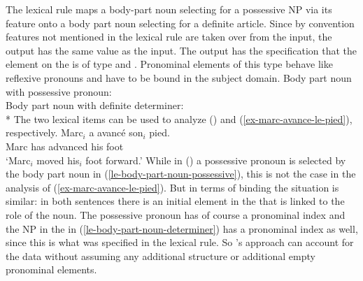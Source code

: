 \documentclass[output=paper,biblatex,babelshorthands,newtxmath,draftmode,colorlinks,citecolor=brown]{langscibook}
\begin{document}
\noindent
The lexical rule maps a body-part noun selecting for a possessive NP  via its \spr feature onto a
body part noun selecting for a definite article. Since by convention features not mentioned in the
lexical rule are taken over from the input, the output has the same \cont value as the input. The
output has the specification that the element on the \argst is of type  and
. Pronominal elements of this type behave like reflexive pronouns and have to be bound
in the subject domain.
\eal
\ex 
\label{le-body-part-noun-possessive}
Body part noun with possessive pronoun:\\
\ex 
\label{le-body-part-noun-determiner}
Body part noun with definite determiner:\\*
\zl 
The two lexical items can be used to analyze () and (\ref{ex-marc-avance-le-pied}), respectively.
\ea
\gll Marc$_i$ a   avancé   son$_i$ pied.\\
     Marc     has advanced his     foot\\
\glt `Marc$_i$ moved his$_i$ foot forward.'
\z
While in () a possessive pronoun is selected by the body part noun in
(\ref{le-body-part-noun-possessive}), this is not the case in the analysis of
(\ref{ex-marc-avance-le-pied}). But in terms of binding the situation is similar: in both sentences
there is an initial element in the \argst that is linked to the  role of the
noun. The possessive pronoun has of course a pronominal index and the NP in the \argst in
(\ref{le-body-part-noun-determiner}) has a pronominal index as well, since this is what was
specified in the lexical rule. So \citeauthor{Koenig1999b}'s approach can account for the data
without assuming any additional structure or additional empty pronominal elements.
\end{document}
